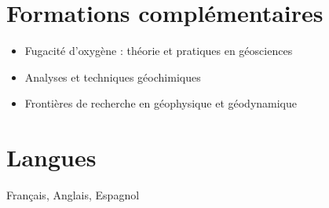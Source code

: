 \documentclass[a4paper,11pt]{article}
\begin{document}
\section{Formations complémentaires}

    \begin{itemize}[label={},itemsep=0pt,parsep=0pt]
        \item Fugacité d’oxygène : théorie et pratiques en géosciences
        \item Analyses et techniques géochimiques
        \item Frontières de recherche en géophysique et géodynamique
    \end{itemize}
    
\section{Langues}

Français, Anglais, Espagnol

\end{document}
